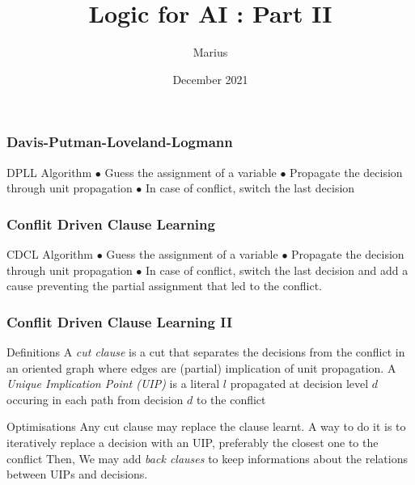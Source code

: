\documentclass[pdf]{beamer}
\title{Logic for AI : Part II}
\author{Marius}
\date{December 2021}
\begin{document}
\maketitle

\begin{frame}
\frametitle{Davis-Putman-Loveland-Logmann}

\begin{block}{DPLL Algorithm}
$\bullet$ Guess the assignment of a variable \newline
$\bullet$ Propagate the decision through unit propagation \newline
$\bullet$ In case of conflict, switch the last decision\newline
\end{block}

\end{frame}

\begin{frame}
\frametitle{Conflit Driven Clause Learning}

\begin{block}{CDCL Algorithm}
$\bullet$ Guess the assignment of a variable \newline
$\bullet$ Propagate the decision through unit propagation \newline
$\bullet$ In case of conflict, switch the last decision and add a cause preventing the partial assignment that led to the conflict. \newline
\end{block}

\end{frame}


\begin{frame}
\frametitle{Conflit Driven Clause Learning II}

\begin{block}{Definitions}
A \emph{cut clause} is a cut that separates the decisions from the conflict in an oriented graph where edges are (partial) implication of unit propagation. \newline
A \emph{Unique Implication Point (UIP)} is a literal $l$ propagated at decision level $d$ occuring in each path from decision $d$ to the conflict  \newline
\end{block}

\begin{exampleblock}{Optimisations}
Any cut clause may replace the clause learnt.\newline
A way to do it is to iteratively replace a decision with an UIP, preferably the closest one to the conflict \newline
Then, We may add \emph{back clauses} to keep informations about the relations between UIPs and decisions.\newline
\end{exampleblock}
\end{frame}
\end{document}
